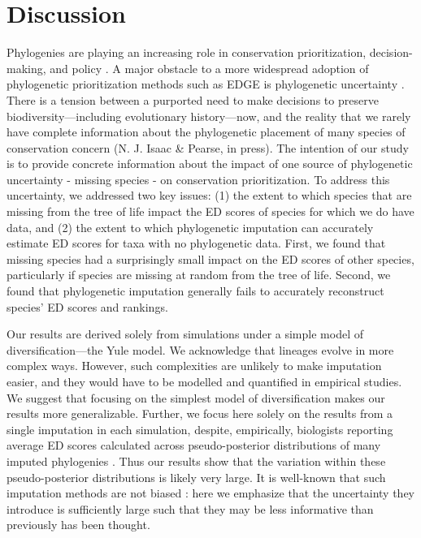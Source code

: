\documentclass[10pt,english]{article}
\begin{document}
\section*{Discussion}
Phylogenies are playing an increasing role in conservation prioritization,
decision-making, and policy \autocite{Vezquez1998, Veron2017}. A major obstacle
to a more widespread adoption of phylogenetic prioritization methods such as
EDGE is phylogenetic uncertainty \autocite{Collen2015}. There is a tension
between a purported need to make decisions to preserve biodiversity---including
evolutionary history---now, and the reality that we rarely have complete
information about the phylogenetic placement of many species of conservation
concern (N. J. Isaac \& Pearse, in press). The intention of our study is to
provide concrete information about the impact of one source of phylogenetic
uncertainty - missing species - on conservation prioritization. To address this
uncertainty, we addressed two key issues: (1) the extent to which species that
are missing from the tree of life impact the ED scores of species for which we
do have data, and (2) the extent to which phylogenetic imputation can accurately
estimate ED scores for taxa with no phylogenetic data. First, we found that
missing species had a surprisingly small impact on the ED scores of other
species, particularly if species are missing at random from the tree of life.
Second, we found that phylogenetic imputation generally fails to accurately
reconstruct species' ED scores and rankings.

Our results are derived solely from simulations under a simple model of
diversification---the Yule model. We acknowledge that lineages evolve in more
complex ways. However, such complexities are unlikely to make imputation easier,
and they would have to be modelled and quantified in empirical studies. We
suggest that focusing on the simplest model of diversification makes our results
more generalizable. Further, we focus here solely on the results from a single
imputation in each simulation, despite, empirically, biologists reporting
average ED scores calculated across pseudo-posterior distributions of many
imputed phylogenies \autocite{Kuhn2011}. Thus our results show that the
variation within these pseudo-posterior distributions is likely very large. It is
well-known that such imputation methods are not biased \autocite[indeed, this
was originally shown by][]{Kuhn2011}: here we emphasize that the uncertainty
they introduce is sufficiently large such that they may be less informative than
previously has been thought.
\end{document}
